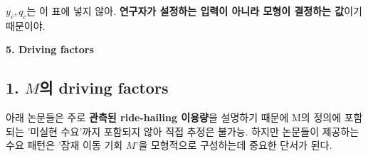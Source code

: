 \documentclass[11pt,a4paper]{article}
\newcommand{\blocktitle}[1]{\par\bigskip\noindent\textbf{\large #1}\par\smallskip}
\begin{document}
$y_c,q_c$는 이 표에 넣지 않아. \textbf{연구자가 설정하는 입력이 아니라 모형이 결정하는 값}이기 때문이야.

\blocktitle{5. Driving factors}

\hypertarget{muxc758-driving-factors-uxadfcuxac70-uxb17cuxbb38-uxcd94uxac00}{%
\subsection{\texorpdfstring{1. \(M\)의 driving factors}{A. M의 driving factors}}\label{muxc758-driving-factors-uxadfcuxac70-uxb17cuxbb38-uxcd94uxac00}}

아래 논문들은 주로 \textbf{관측된 ride-hailing 이용량}을 설명하기 때문에 M의 정의에 포함되는 '미실현 수요'까지 포함되지 않아 직접 추정은 불가능. 하지만 논문들이 제공하는 수요 패턴은 '잠재 이동 기회 \(M\)'을 모형적으로 구성하는데 중요한 단서가 된다.
\end{document}
